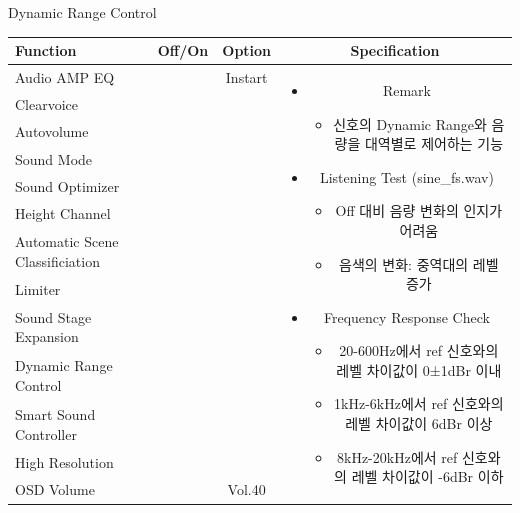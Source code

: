\documentclass{beamer}
\begin{document}
\begin{frame}[t]{Dynamic Range Control}
\begin{tiny}
\begin{tabular}{@{}lccc@{}}
\toprule
Function & Off/On & Option & Specification \\
\midrule
Audio AMP EQ & \color{black}{Off} & Instart &
\multirow{13}{60mm}{
\begin{itemize}
\item Remark
	\begin{itemize}
	\item 신호의 Dynamic Range와 음량을 대역별로 제어하는 기능
	\end{itemize}
\item Listening Test (sine\_fs.wav)
	\begin{itemize}
	\item Off 대비 음량 변화의 인지가 어려움
	\item 음색의 변화: 중역대의 레벨 증가
	\end{itemize}
\item Frequency Response Check
  \begin{itemize}
  \item 20-600Hz에서 ref 신호와의 레벨 차이값이 0±1dBr 이내
  \item 1kHz-6kHz에서 ref 신호와의 레벨 차이값이 6dBr 이상
  \item 8kHz-20kHz에서 ref 신호와의 레벨 차이값이 -6dBr 이하
  \end{itemize}
\end{itemize}
} \\
Clearvoice & \color{black}{Off} & & \\
Autovolume & \color{black}{Off} & & \\
Sound Mode & \color{black}{Off} & & \\
Sound Optimizer & \color{black}{Off} & & \\
Height Channel & \color{black}{Off} & & \\
Automatic Scene Classificiation & \color{black}{Off} & & \\
Limiter & \color{black}{Off} & & \\
Sound Stage Expansion & \color{black}{Off} & & \\
Dynamic Range Control & \color{blue}{On} & & \\
Smart Sound Controller & \color{black}{Off} & & \\
High Resolution & \color{black}{Off} & & \\
OSD Volume & \color{blue}{On} & Vol.40 & \\
\midrule
\end{tabular}
\end{tiny}


\end{frame}
\end{document}
